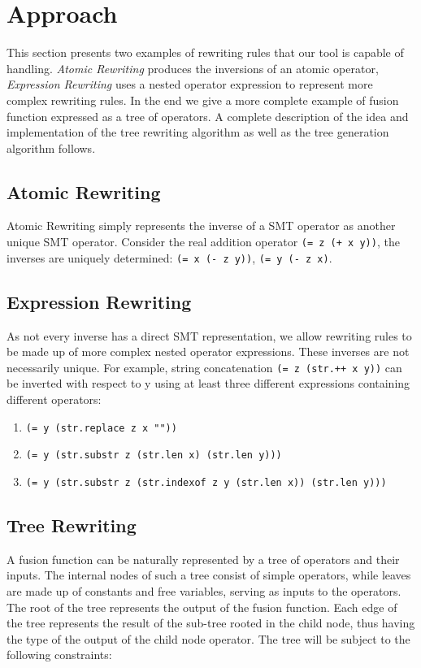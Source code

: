 \documentclass[sigplan,screen]{acmart}
\begin{document}
\section{Approach} \label{sec:approach}
This section presents two examples of rewriting rules that our tool is capable of handling. \textit{Atomic Rewriting} produces the inversions of an atomic operator, \textit{Expression Rewriting} uses a nested operator expression to represent more complex rewriting rules. In the end we give a more complete example of fusion function expressed as a tree of operators. A complete description of the idea and implementation of the tree rewriting algorithm as well as the tree generation algorithm follows.

\subsection{Atomic Rewriting}
Atomic Rewriting simply represents the inverse of a SMT operator as another unique SMT operator. Consider the real addition operator \lstinline[columns=fullflexible]{(= z (+ x y))}, the inverses are uniquely determined: \lstinline[columns=fullflexible]{(= x (- z y))}, \lstinline[columns=fullflexible]{(= y (- z x)}.

\subsection{Expression Rewriting}
As not every inverse has a direct SMT representation, we allow rewriting rules to be made up of more complex nested operator expressions. These inverses are not necessarily unique. For example, string concatenation \lstinline[columns=fullflexible]{(= z (str.++ x y))} can be inverted with respect to y using at least three different expressions containing different operators:
\begin{enumerate}
    \item \lstinline[columns=fullflexible]{(= y (str.replace z x ""))}
    \item \lstinline[columns=fullflexible]{(= y (str.substr z (str.len x) (str.len y)))}
    \item \lstinline[columns=fullflexible]{(= y (str.substr z (str.indexof z y (str.len x)) (str.len y)))}
\end{enumerate}


\subsection{Tree Rewriting}
A fusion function can be naturally represented by a tree of operators and their inputs. The internal nodes of such a tree consist of simple operators, while leaves are made up of constants and free variables, serving as inputs to the operators. The root of the tree represents the output of the fusion function. Each edge of the tree represents the result of the sub-tree rooted in the child node, thus having the type of the output of the child node operator. The tree will be subject to the following constraints:
\end{document}
